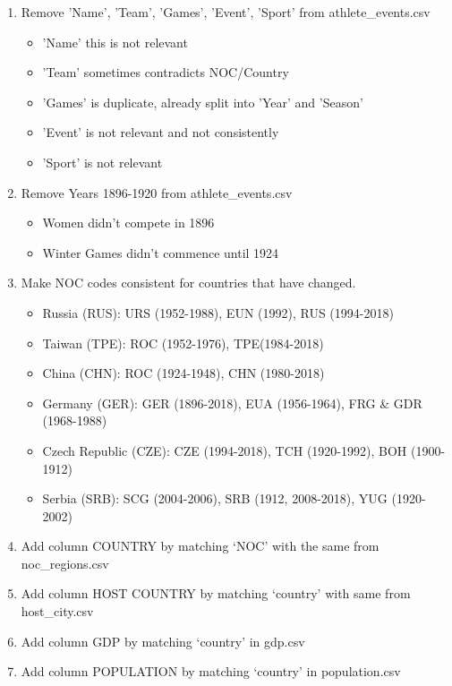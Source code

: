\documentclass[a4 paper, 12pt]{article}
\begin{document}
        \begin{enumerate}
            \item Remove 'Name', 'Team', 'Games', 'Event', 'Sport' from athlete\_events.csv
                \begin{itemize}
                    \item 'Name' this is not relevant
                    \item 'Team' sometimes contradicts NOC/Country
                    \item 'Games' is duplicate, already split into 'Year' and 'Season'
                    \item 'Event' is not relevant and not consistently
                    \item 'Sport' is not relevant        
                \end{itemize}
            \item Remove Years 1896-1920 from athlete\_events.csv
                \begin{itemize}
                    \item Women didn't compete in 1896
                    \item Winter Games didn't commence until 1924
                \end{itemize}
            \item Make NOC codes consistent for countries that have changed.
                \begin{itemize}
                    \item Russia (RUS): URS (1952-1988), EUN (1992), RUS (1994-2018)
                    \item Taiwan (TPE): ROC (1952-1976), TPE(1984-2018)
                    \item China (CHN): ROC (1924-1948), CHN (1980-2018)
                    \item Germany (GER): GER (1896-2018), EUA (1956-1964), FRG \& GDR (1968-1988)
                    \item Czech Republic (CZE): CZE (1994-2018), TCH (1920-1992), BOH (1900-1912)
                    \item Serbia (SRB): SCG (2004-2006), SRB (1912, 2008-2018), YUG (1920-2002)
                \end{itemize}
            
            \item Add column COUNTRY by matching ‘NOC’ with the same from noc\_regions.csv
            \item Add column HOST COUNTRY by matching ‘country’ with same from host\_city.csv
            \item Add column GDP by matching ‘country’ in gdp.csv
            \item Add column POPULATION by matching ‘country’ in population.csv  
        \end{enumerate}
    
\end{document}
